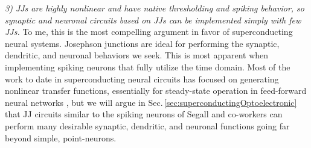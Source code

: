 \documentclass[twocolumn]{article}
\begin{document}
  \vspace{1em}
\textit{3) JJs are highly nonlinear and have native thresholding and spiking behavior, so synaptic and neuronal circuits based on JJs can be implemented simply with few JJs.} \newline To me, this is the most compelling argument in favor of superconducting neural systems. Josephson junctions are ideal for performing the synaptic, dendritic, and neuronal behaviors we seek. This is most apparent when implementing spiking neurons that fully utilize the time domain. Most of the work to date in superconducting neural circuits has focused on generating nonlinear transfer functions, essentially for steady-state operation in feed-forward neural networks \cite{hago1991,hiak1991,mina1994a,mina1994b,mina1995,rilo1997,koko2005,onko2009,onma2011,yaum2013,sckl2016,klsc2018,sosc2018,ru2016,scdo2018,scdo2018b,chgo2018}, but we will argue in Sec.\,\ref{sec:superconductingOptoelectronic} that JJ circuits similar to the spiking neurons of Segall and co-workers \cite{crsc2010,segu2014,sele2017} can perform many desirable synaptic, dendritic, and neuronal functions going far beyond simple, point-neurons.
\end{document}
